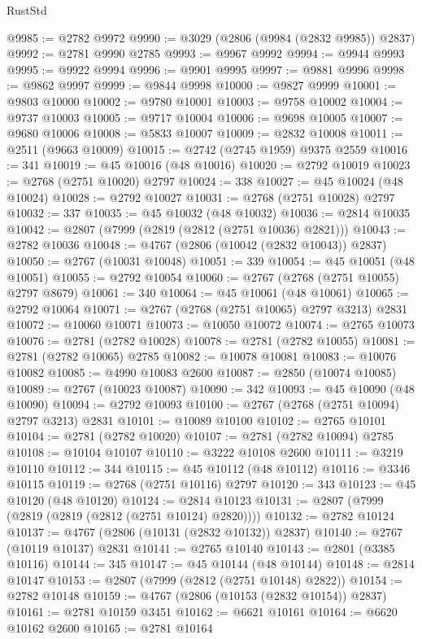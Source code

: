 \begin{lexlean}{RustStd}
\begin{coremodule}
@9985 := @2782 @9972
@9990 := @3029 (@2806 (@9984 (@2832 @9985)) @2837)
@9992 := @2781 @9990 @2785
@9993 := @9967 @9992
@9994 := @9944 @9993
@9995 := @9922 @9994
@9996 := @9901 @9995
@9997 := @9881 @9996
@9998 := @9862 @9997
@9999 := @9844 @9998
@10000 := @9827 @9999
@10001 := @9803 @10000
@10002 := @9780 @10001
@10003 := @9758 @10002
@10004 := @9737 @10003
@10005 := @9717 @10004
@10006 := @9698 @10005
@10007 := @9680 @10006
@10008 := @5833 @10007
@10009 := @2832 @10008
@10011 := @2511 (@9663 @10009)
@10015 := @2742 (@2745 @1959) @9375 @2559
@10016 := 341
@10019 := @45 @10016 (@48 @10016)
@10020 := @2792 @10019
@10023 := @2768 (@2751 @10020) @2797
@10024 := 338
@10027 := @45 @10024 (@48 @10024)
@10028 := @2792 @10027
@10031 := @2768 (@2751 @10028) @2797
@10032 := 337
@10035 := @45 @10032 (@48 @10032)
@10036 := @2814 @10035
@10042 := @2807 (@7999 (@2819 (@2812 (@2751 @10036) @2821)))
@10043 := @2782 @10036
@10048 := @4767 (@2806 (@10042 (@2832 @10043)) @2837)
@10050 := @2767 (@10031 @10048)
@10051 := 339
@10054 := @45 @10051 (@48 @10051)
@10055 := @2792 @10054
@10060 := @2767 (@2768 (@2751 @10055) @2797 @8679)
@10061 := 340
@10064 := @45 @10061 (@48 @10061)
@10065 := @2792 @10064
@10071 := @2767 (@2768 (@2751 @10065) @2797 @3213) @2831
@10072 := @10060 @10071
@10073 := @10050 @10072
@10074 := @2765 @10073
@10076 := @2781 (@2782 @10028)
@10078 := @2781 (@2782 @10055)
@10081 := @2781 (@2782 @10065) @2785
@10082 := @10078 @10081
@10083 := @10076 @10082
@10085 := @4990 @10083 @2600
@10087 := @2850 (@10074 @10085)
@10089 := @2767 (@10023 @10087)
@10090 := 342
@10093 := @45 @10090 (@48 @10090)
@10094 := @2792 @10093
@10100 := @2767 (@2768 (@2751 @10094) @2797 @3213) @2831
@10101 := @10089 @10100
@10102 := @2765 @10101
@10104 := @2781 (@2782 @10020)
@10107 := @2781 (@2782 @10094) @2785
@10108 := @10104 @10107
@10110 := @3222 @10108 @2600
@10111 := @3219 @10110
@10112 := 344
@10115 := @45 @10112 (@48 @10112)
@10116 := @3346 @10115
@10119 := @2768 (@2751 @10116) @2797
@10120 := 343
@10123 := @45 @10120 (@48 @10120)
@10124 := @2814 @10123
@10131 := @2807 (@7999 (@2819 (@2819 (@2812 (@2751 @10124) @2820))))
@10132 := @2782 @10124
@10137 := @4767 (@2806 (@10131 (@2832 @10132)) @2837)
@10140 := @2767 (@10119 @10137) @2831
@10141 := @2765 @10140
@10143 := @2801 (@3385 @10116)
@10144 := 345
@10147 := @45 @10144 (@48 @10144)
@10148 := @2814 @10147
@10153 := @2807 (@7999 (@2812 (@2751 @10148) @2822))
@10154 := @2782 @10148
@10159 := @4767 (@2806 (@10153 (@2832 @10154)) @2837)
@10161 := @2781 @10159 @3451
@10162 := @6621 @10161
@10164 := @6620 @10162 @2600
@10165 := @2781 @10164

\end{coremodule}
\end{lexlean}
